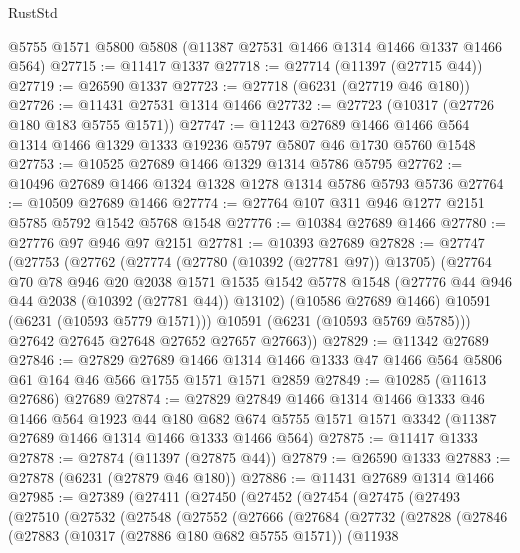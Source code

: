 \begin{lexlean}{RustStd}
\begin{coremodule}
{{    @5755
    @1571
    @5800
    @5808
    (@11387 @27531 @1466 @1314 @1466 @1337 @1466 @564)
@27715 := @11417 @1337
@27718 := @27714 (@11397 (@27715 @44))
@27719 := @26590 @1337
@27723 := @27718 (@6231 (@27719 @46 @180))
@27726 := @11431 @27531 @1314 @1466
@27732 := @27723 (@10317 (@27726 @180 @183 @5755 @1571))
@27747 := @11243
    @27689
    @1466
    @1466
    @564
    @1314
    @1466
    @1329
    @1333
    @19236
    @5797
    @5807
    @46
    @1730
    @5760
    @1548
@27753 := @10525 @27689 @1466 @1329 @1314 @5786 @5795
@27762 := @10496 @27689 @1466 @1324 @1328 @1278 @1314 @5786 @5793 @5736
@27764 := @10509 @27689 @1466
@27774 := @27764 @107 @311 @946 @1277 @2151 @5785 @5792 @1542 @5768 @1548
@27776 := @10384 @27689 @1466
@27780 := @27776 @97 @946 @97 @2151
@27781 := @10393 @27689
@27828 := @27747
    (@27753
      (@27762
        (@27774
          (@27780 (@10392 (@27781 @97)) @13705)
          (@27764
            @70
            @78
            @946
            @20
            @2038
            @1571
            @1535
            @1542
            @5778
            @1548
            (@27776 @44 @946 @44 @2038 (@10392 (@27781 @44)) @13102)
            (@10586 @27689 @1466)
            @10591
            (@6231 (@10593 @5779 @1571)))
          @10591
          (@6231 (@10593 @5769 @5785)))
        @27642
        @27645
        @27648
        @27652
        @27657
        @27663))
@27829 := @11342 @27689
@27846 := @27829
    @27689
    @1466
    @1314
    @1466
    @1333
    @47
    @1466
    @564
    @5806
    @61
    @164
    @46
    @566
    @1755
    @1571
    @1571
    @2859
@27849 := @10285 (@11613 @27686) @27689
@27874 := @27829
    @27849
    @1466
    @1314
    @1466
    @1333
    @46
    @1466
    @564
    @1923
    @44
    @180
    @682
    @674
    @5755
    @1571
    @1571
    @3342
    (@11387 @27689 @1466 @1314 @1466 @1333 @1466 @564)
@27875 := @11417 @1333
@27878 := @27874 (@11397 (@27875 @44))
@27879 := @26590 @1333
@27883 := @27878 (@6231 (@27879 @46 @180))
@27886 := @11431 @27689 @1314 @1466
@27985 := @27389
    (@27411
      (@27450
        (@27452
          (@27454
            (@27475
              (@27493
                (@27510
                  (@27532
                    (@27548
                      (@27552
                        (@27666
                          (@27684
                            (@27732
                              (@27828
                                (@27846
                                  (@27883
                                    (@10317 (@27886 @180 @682 @5755 @1571))
                                    (@11938
}}
\end{coremodule}
\end{lexlean}
